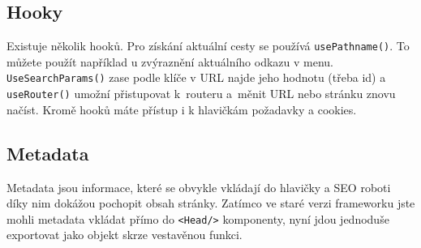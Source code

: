 \subsection*{Hooky}

Existuje několik hooků. Pro získání aktuální cesty se používá \texttt{usePathname()}. To můžete použít například u zvýraznění aktuálního odkazu v menu. \texttt{UseSearchParams()} zase podle klíče v URL najde jeho hodnotu (třeba id) a \texttt{useRouter()} umožní přistupovat k~routeru a~měnit URL nebo stránku znovu načíst. Kromě hooků máte přístup i k hlavičkám požadavky a cookies.

\subsection*{Metadata}
Metadata jsou informace, které se obvykle vkládají do hlavičky a SEO roboti díky nim dokážou pochopit obsah stránky. Zatímco ve staré verzi frameworku jste mohli metadata vkládat přímo do \texttt{<Head/>} komponenty, nyní jdou jednoduše exportovat jako objekt skrze vestavěnou funkci.



